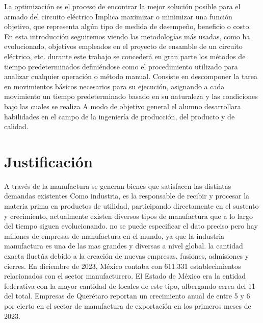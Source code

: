      La optimización es el proceso de encontrar la mejor solución posible para el armado del circuito eléctrico Implica maximizar o minimizar una función objetivo, que representa algún tipo de medida de desempeño, beneficio o costo.
     En esta introducción seguiremos viendo las metodologías más usadas, como ha evolucionado, objetivos empleados en el  proyecto de ensamble de un circuito eléctrico, etc.
    durante este trabajo se concederá en gran parte los métodos de tiempo predeterminados definiéndose como el procedimiento utilizado para analizar cualquier operación o método manual. Consiste en descomponer la tarea en movimientos básicos necesarios para su ejecución, asignando a cada movimiento un tiempo predeterminado basado en su naturaleza y las condiciones bajo las cuales se realiza
    A modo de objetivo general el alumno desarrollara habilidades en el campo de la ingeniería de producción, del producto y de calidad.
    \section{Justificación}
    
    A través de la manufactura se generan bienes que satisfacen las distintas demandas existentes Como industria, es la responsable de recibir y procesar la materia prima en productos de utilidad, participando directamente en el sustento y crecimiento, actualmente existen diversos tipos de manufactura que a lo largo del tiempo siguen evolucionando.
    no se puede especificar el dato preciso pero hay millones de empresas de manufactura en el mundo, ya que la industria manufactura es una de las mas grandes y diversas a nivel global. la cantidad exacta fluctúa debido a la creación de nuevas empresas, fusiones, admisiones y cierres. 
    En diciembre de 2023, México contaba con 611.331 establecimientos relacionados con el sector manufacturero. El Estado de México era la entidad federativa con la mayor cantidad de locales de este tipo, albergando cerca del 11
     del total.
    Empresas de Querétaro reportan un crecimiento anual de entre 5 y 6 por cierto  en el sector de manufactura de exportación en los primeros meses de 2023.
